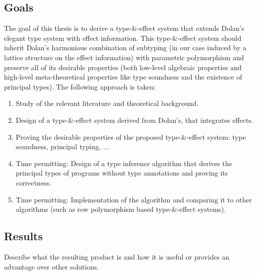 \subsection{Goals}
The goal of this thesis is to derive a type-\&-effect system that extends Dolan's elegant type system with effect information. This type-\&-effect system should inherit Dolan's harmonious combination of subtyping (in our case induced by a lattice structure on the effect information) with parametric polymorphism and preserve all of its desirable properties (both low-level algebraic properties and high-level meta-theoretical properties like type soundness and the existence of principal types). The following approach is taken:
\begin{enumerate}
\item Study of the relevant literature and theoretical background.
\item Design of a type-\&-effect system derived from Dolan's, that integrates effects.
\item Proving the desirable properties of the proposed type-\&-effect system: type soundness, principal typing, ...
\item Time permitting: Design of a type inference algorithm that derives the principal types of programs without type annotations and proving its correctness.
\item Time permitting: Implementation of the algorithm and comparing it to other algorithms (such as row polymorphism based type-\&-effect systems).
\end{enumerate}

\subsection{Results}
Describe what the resulting product is and how it is useful or provides an advantage over other solutions.